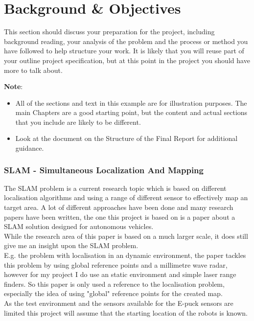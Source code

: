 \chapter{Background \& Objectives}
\label{Background}

This section should discuss your preparation for the project, including background reading, your analysis of the problem and the process or method you have followed to help structure your work.  It is likely that you will reuse part of your outline project specification, but at this point in the project you should have more to talk about. 

\textbf{Note}: 

\begin{itemize}
   \item All of the sections and text in this example are for illustration purposes. The main Chapters are a good starting point, but the content and actual sections that you include are likely to be different.
   
   \item Look at the document on the Structure of the Final Report for additional guidance. 
   
\end {itemize}

\subsection{SLAM - Simultaneous Localization And Mapping}
The SLAM problem is a current research topic which is based on different localisation algorithms and using a range of different sensor to effectively map an target area. A lot of different approaches have been done and many research papers have been written, the one this project is based on is a paper about a SLAM solution designed for autonomous vehicles\cite{Dissanayake2001Solution}.\\
While the research area of this paper is based on a much larger scale, it does still give me an insight upon the SLAM problem.\\
E.g. the problem with localisation in an dynamic environment, the paper tackles this problem by using global reference points and a millimetre wave radar, however for my project I do use an static environment and simple laser range finders. So this paper is only used a reference to the localisation problem, especially the idea of using "global" reference points for the created map.\\
As the test environment and the sensors available for the E-puck sensors are limited this project will assume that the starting location of the robots is known.\\[3ex]

